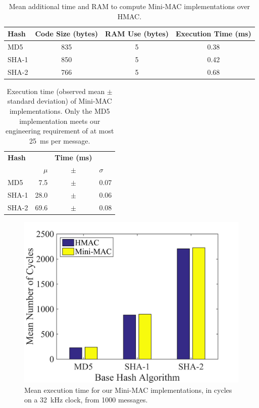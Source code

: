 	\begin{table}	
	\centering	
	\caption{Mean additional time and RAM to compute Mini-MAC implementations over HMAC.}
	\label{tab-overhead}
	\vspace{8pt}
	\begin{tabular}{l|c|c|c}%
	\bfseries Hash & \bfseries Code Size (bytes) & \bfseries RAM Use (bytes) & \bfseries Execution Time (ms)\\\hline 
	MD5 & 835 & 5 & 0.38 \\
	SHA-1 & 850 & 5 & 0.42 \\
	SHA-2 & 766 & 5 & 0.68 \\
	\end{tabular}
	\end{table}
	
	\begin{table}
	\centering
	\caption{Execution time (observed mean $\pm$ standard deviation) of Mini-MAC implementations.
	Only the MD5 implementation meets our engineering requirement of at most 25~ms per message.}
	\label{tab-time}
	\vspace{8pt}
	\begin{tabular}{ @{}l | rcl}
	\hspace{2pt}\textbf{Hash} && {\textbf{Time (ms)}}&\\
		& $\mu$ & $\pm$ & $\sigma$   \\
		\hline 
		\hspace{2pt}MD5 	& 7.5 		& $\pm$ 	& 0.07 \\
		\hspace{2pt}SHA-1 	& 28.0 		& $\pm$		& 0.06 \\
		\hspace{2pt}SHA-2 	& 69.6 		& $\pm$		& 0.08 \\ 
	\end{tabular}	
	\end{table}
	
	\begin{figure}
		\centering
		\includegraphics[width=\columnwidth]{figures/exec_cycles.png}
		\caption{Mean execution time for our Mini-MAC implementations, in cycles on a 32~kHz clock,
		from 1000 messages.}
		\label{fig-execution}
	\end{figure}
	
